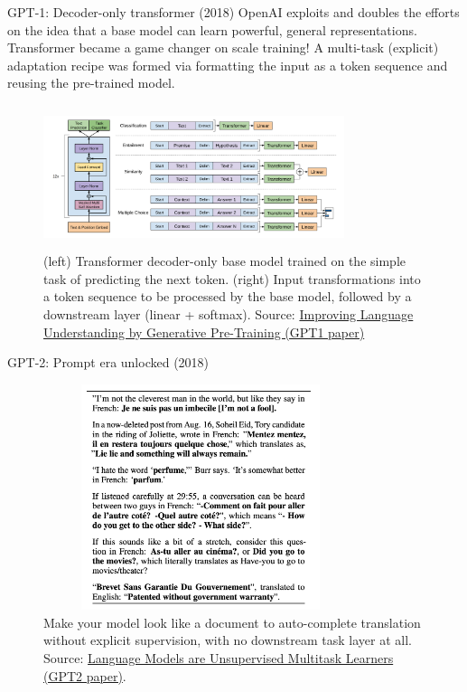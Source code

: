 \documentclass[9pt]{beamer}
\begin{document}
\begin{frame}{GPT-1: Decoder-only transformer (2018)}  
   OpenAI exploits and doubles the efforts on the idea that a base model can learn powerful, general representations. Transformer became a game changer on scale training! A multi-task (explicit) adaptation recipe was formed via formatting the input as a token sequence and reusing the pre-trained model.

    \begin{figure}
        \centering
        \includegraphics[width = 8.8cm, height=4.2cm]{img/gpt1-downstream-tasks.png}
        \caption{(left) Transformer decoder-only base model trained on the simple task of predicting the next token. (right) Input transformations into a token sequence to be processed by the base model, followed by a downstream layer (linear + softmax). Source: \href{https://s3-us-west-2.amazonaws.com/openai-assets/research-covers/language-unsupervised/language_understanding_paper.pdf}{Improving Language Understanding by Generative Pre-Training (GPT1 paper)}}
        \label{fig:enter-label}
    \end{figure}
\end{frame}

\begin{frame}{GPT-2: Prompt era unlocked (2018)}  
    \begin{figure}
        \centering
        \includegraphics[width = 9.2cm, height=6.6cm]{img/prompt-era-ex2.png}
        \caption{Make your model look like a document to auto-complete translation without explicit supervision, with no downstream task layer at all. Source: \href{https://d4mucfpksywv.cloudfront.net/better-language-models/language_models_are_unsupervised_multitask_learners.pdf}{Language Models are Unsupervised Multitask Learners (GPT2 paper)}.}
        \label{fig:enter-label}
    \end{figure}
\end{frame}
\end{document}
